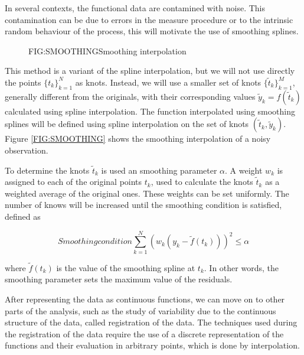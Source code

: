 
In several contexts, the functional data are contamined with noise.
This contamination can be due to errors in the measure procedure or to
the intrinsic random behaviour of the process,
this will motivate the use of smoothing splines.

\begin{figure}[Example of smoothing]{FIG:SMOOTHING}{Smoothing interpolation}
	 \quad
\end{figure}

This method is a variant of the spline interpolation, but we will not
use directly the points $\{t_k\}_{k=1}^{N}$ as knots. Instead, we will use a
smaller set of knots $\{\tilde t_k\}_{k=1}^{M}$, generally different from the
originals, with their corresponding values $\tilde y_k = f(\tilde t_k)$
calculated using spline interpolation. The function interpolated using smoothing
splines will be defined using spline interpolation on the set of knots
$(\tilde t_k, \tilde y_k)$. Figure \ref{FIG:SMOOTHING} shows the smoothing
interpolation of a noisy observation.

To determine the knots $\tilde t_k$ is used an smoothing parameter $\alpha$.
A weight $w_k$ is assigned to each of the original points $t_k$, used to calculate
the knots $\tilde t_k$ as a weighted average of the original ones. These weights
can be set uniformly.
The number of knows will be increased until the smoothing condition is satisfied,
defined as

\begin{equation}[]{Smoothing condition}
\sum_{k=1}^N \left (  w_k (y_k - \tilde f(t_k)) \right)^2 \le \alpha
\end{equation}

where $\tilde f(t_k)$ is the value of the smoothing spline at $t_k$.
In other words, the smoothing parameter sets the maximum value of the residuals.

After representing the data as continuous functions, we can move on to other
parts of the analysis, such as the study of variability due to the continuous
structure of the data, called registration of the data. The techniques used
during the registration of the data require the use of a discrete
representation of the functions and their evaluation in arbitrary points,
which is done by interpolation.
